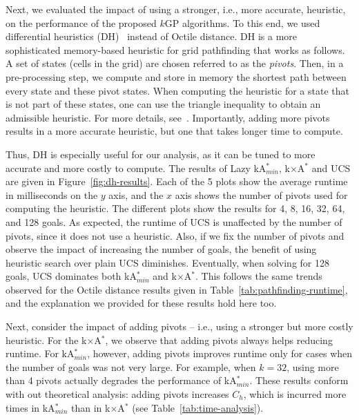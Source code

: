 \documentclass{aicom2e}
\newcommand{\kgs}{$k$GP}
\newcommand{\kastarmin}{kA$^*_{min}$}
\newcommand{\kxastar}{k$\times$A$^*$}
\begin{document}
Next, we evaluated the impact of using a stronger, i.e., more accurate, heuristic, on the performance of the proposed \kgs{} algorithms. To this end, we used differential heuristics (DH)~\cite{goldberg2005computing,ng2002predicting,sturtevant2009memory} instead of Octile distance. DH is a more sophisticated memory-based heuristic for grid pathfinding that works as follows. A set of states (cells in the grid) are chosen  referred to as the {\em pivots}. Then, in a pre-processing step, we compute and store in memory the shortest path between every state and these pivot states. When computing the heuristic for a state that is not part of these states, 
one can use the triangle inequality to obtain an admissible heuristic. For more details, see~\cite{goldberg2005computing,ng2002predicting,sturtevant2009memory}. 
Importantly, adding more pivots results in a more accurate heuristic, 
but one that takes longer time to compute. 

Thus, DH is especially useful for our analysis, as it can be tuned to more accurate and more costly to compute. The results of Lazy \kastarmin{}, \kxastar{} and UCS are given in Figure~\ref{fig:dh-results}. Each of the 5 plots show the average runtime in milliseconds on the $y$ axis, and the $x$ axis shows the number of pivots used for computing the heuristic. 
The different plots show the results for 4, 8, 16, 32, 64, and 128 goals. 
As expected, the runtime of UCS is unaffected by the number of pivots, since it does not use a heuristic. Also, if we fix the number of pivots and observe the impact of increasing the number of goals, the benefit of using heuristic search over plain UCS diminishes. Eventually, when solving for 128 goals, UCS dominates both \kastarmin{} and \kxastar{}. This follows the same trends observed for the Octile distance results given in Table~\ref{tab:pathfinding-runtime}, and the explanation we provided for these results hold here too. %

Next, consider the impact of adding pivots -- i.e., using a stronger but more costly heuristic. 
For the \kxastar{}, we observe that adding pivots always helps reducing runtime. For \kastarmin{}, however, adding pivots improves runtime only for cases when the number of goals was not very large. For example, when $k=32$, using more than 4 pivots actually degrades the performance of \kastarmin{}. These results conform with out theoretical analysis: adding pivots increases $C_h$, which is incurred more times in \kastarmin{} than in \kxastar{} (see Table~\ref{tab:time-analysis}). 
\end{document}
